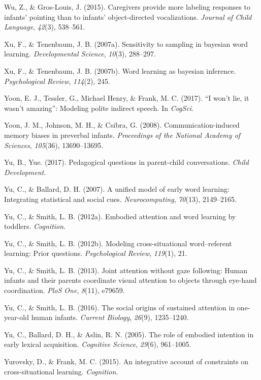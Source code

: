 \documentclass[english,floatsintext,man]{apa6}
\theoremstyle{definition}
\theoremstyle{definition}
\theoremstyle{definition}
\theoremstyle{remark}
\begin{document}
\hypertarget{ref-wu2015caregivers}{}
Wu, Z., \& Gros-Louis, J. (2015). Caregivers provide more labeling
responses to infants' pointing than to infants' object-directed
vocalizations. \emph{Journal of Child Language}, \emph{42}(3), 538--561.

\hypertarget{ref-xu2007sampling}{}
Xu, F., \& Tenenbaum, J. B. (2007a). Sensitivity to sampling in bayesian
word learning. \emph{Developmental Science}, \emph{10}(3), 288--297.

\hypertarget{ref-xu2007word}{}
Xu, F., \& Tenenbaum, J. B. (2007b). Word learning as bayesian
inference. \emph{Psychological Review}, \emph{114}(2), 245.

\hypertarget{ref-yoonwon}{}
Yoon, E. J., Tessler, G., Michael Henry, \& Frank, M. C. (2017). ``I
won't lie, it wasn't amazing'': Modeling polite indirect speech. In
\emph{CogSci}.

\hypertarget{ref-yoon2008communication}{}
Yoon, J. M., Johnson, M. H., \& Csibra, G. (2008). Communication-induced
memory biases in preverbal infants. \emph{Proceedings of the National
Academy of Sciences}, \emph{105}(36), 13690--13695.

\hypertarget{ref-yu2017peagogical}{}
Yu, B., Yue. (2017). Pedagogical questions in parent-child
conversations. \emph{Child Development}.

\hypertarget{ref-yu2007unified}{}
Yu, C., \& Ballard, D. H. (2007). A unified model of early word
learning: Integrating statistical and social cues.
\emph{Neurocomputing}, \emph{70}(13), 2149--2165.

\hypertarget{ref-yu2012embodied}{}
Yu, C., \& Smith, L. B. (2012a). Embodied attention and word learning by
toddlers. \emph{Cognition}.

\hypertarget{ref-yu2012modeling}{}
Yu, C., \& Smith, L. B. (2012b). Modeling cross-situational
word--referent learning: Prior questions. \emph{Psychological Review},
\emph{119}(1), 21.

\hypertarget{ref-yu2013joint}{}
Yu, C., \& Smith, L. B. (2013). Joint attention without gaze following:
Human infants and their parents coordinate visual attention to objects
through eye-hand coordination. \emph{PloS One}, \emph{8}(11), e79659.

\hypertarget{ref-yu2016social}{}
Yu, C., \& Smith, L. B. (2016). The social origins of sustained
attention in one-year-old human infants. \emph{Current Biology},
\emph{26}(9), 1235--1240.

\hypertarget{ref-yu2005role}{}
Yu, C., Ballard, D. H., \& Aslin, R. N. (2005). The role of embodied
intention in early lexical acquisition. \emph{Cognitive Science},
\emph{29}(6), 961--1005.

\hypertarget{ref-yurovsky2014algorithmic}{}
Yurovsky, D., \& Frank, M. C. (2015). An integrative account of
constraints on cross-situational learning. \emph{Cognition}.
\end{document}
